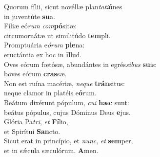 \oddverse Quorum fílii, sicut novéllæ plan\textit{ta}\textit{ti}\textbf{ó}nes~\*\\
\oddverse in juventúte \textbf{su}a.\\
\evenverse Fíliæ eó\textit{rum} \textit{com}\textbf{pó}sitæ:~\*\\
\evenverse circumornátæ ut similitúdo \textbf{tem}pli.\\
\oddverse Promptuária e\textit{ó}\textit{rum} \textbf{ple}na:~\*\\
\oddverse eructántia ex hoc in \textbf{il}lud.\\
\evenverse Oves eórum fœtósæ, abundántes in egrés\textit{si}\textit{bus} \textbf{su}is:~\*\\
\evenverse boves eórum \textbf{cras}sæ.\\
\oddverse Non est ruína macériæ, \textit{ne}\textit{que} \textbf{trán}situs:~\*\\
\oddverse neque clamor in platéis e\textbf{ó}rum.\\
\evenverse Beátum dixérunt pópulum, \textit{cu}\textit{i} \textbf{hæc} sunt:~\*\\
\evenverse beátus pópulus, cujus Dóminus Deus \textbf{e}jus.\\
\oddverse Glória Pa\textit{tri}, \textit{et} \textbf{Fí}lio,~\*\\
\oddverse et Spirítui \textbf{San}cto.\\
\evenverse Sicut erat in princípio, et \textit{nunc}, \textit{et} \textbf{sem}per,~\*\\
\evenverse et in sǽcula sæculórum. \textbf{A}men.\\
